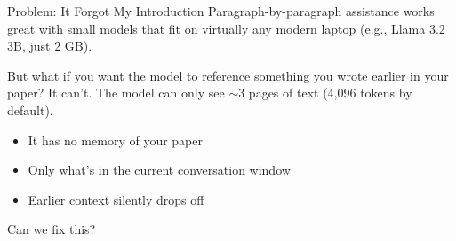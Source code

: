 \documentclass[aspectratio=169]{beamer}
\begin{document}
\begin{frame}{Problem: It Forgot My Introduction}
    Paragraph-by-paragraph assistance works great with small models that fit on virtually any modern laptop (e.g., Llama 3.2 3B, just 2 GB).

    \vspace{0.8em}
    But what if you want the model to reference something you wrote earlier in your paper? It can't. The model can only see $\sim$3 pages of text (4,096 tokens by default).

    \vspace{0.5em}
    \begin{itemize}
        \vspace{0.3em}
        \item It has no memory of your paper
        \vspace{0.3em}
        \item Only what's in the current conversation window
        \vspace{0.3em}
        \item Earlier context silently drops off
    \end{itemize}

    \vspace{1em}
    Can we fix this?
\end{frame}

\end{document}
